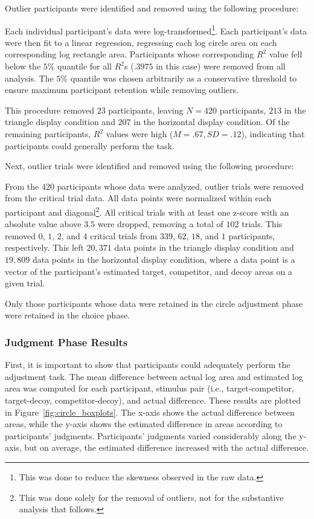 Outlier participants were identified and removed using the following procedure:

Each individual participant's data were log-transformed\footnote{This was done to reduce the skewness observed in the raw data.}. Each participant's data were then fit to a linear regression, regressing each log circle area on each corresponding log rectangle area. Participants whose corresponding $R^2$ value fell below the $5\%$ quantile for all $R^2$s ($.3975$ in this case) were removed from all analysis. The $5\%$ quantile was chosen arbitrarily as a conservative threshold to ensure maximum participant retention while removing outliers. 

This procedure removed $23$ participants, leaving $N=420$ participants, $213$ in the triangle display condition and $207$ in the horizontal display condition. Of the remaining participants, $R^2$ values were high ($M=.67,SD=.12$), indicating that participants could generally perform the task.

Next, outlier trials were identified and removed using the following procedure:

From the $420$ participants whose data were analyzed, outlier trials were removed from the critical trial data. All data points were normalized within each participant and diagonal\footnote{This was done solely for the removal of outliers, not for the substantive analysis that follows.}. All critical trials with at least one z-score with an absolute value above $3.5$ were dropped, removing a total of $102$ trials. This removed $0$, $1$, $2$, and $4$ critical trials from $339$, $62$, $18$, and $1$ participants, respectively. This left $20,371$ data points in the triangle display condition and $19,809$ data points in the horizontal display condition, where a data point is a vector of the participant's estimated target, competitor, and decoy areas on a given trial. 

Only those participants whose data were retained in the circle adjustment phase were retained in the choice phase. 

\subsubsection{Judgment Phase Results}

First, it is important to show that participants could adequately perform the adjustment task. The mean difference between actual log area and estimated log area was computed for each participant, stimulus pair (i.e., target-competitor, target-decoy, competitor-decoy), and actual difference. These results are plotted in Figure~\ref{fig:circle_boxplots}. The x-axis shows the actual difference between areas, while the y-axis shows the estimated difference in areas according to participants' judgments. Participants' judgments varied considerably along the y-axis, but on average, the estimated difference increased with the actual difference. 

